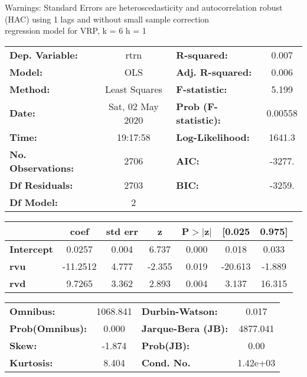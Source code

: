 Warnings: \newline
 [1] Standard Errors are heteroscedasticity and autocorrelation robust (HAC) using 1 lags and without small sample correction\\ 

regression model for VRP, k = 6 h = 1\begin{center}
\begin{tabular}{lclc}
\toprule
\textbf{Dep. Variable:}    &       rtrn       & \textbf{  R-squared:         } &     0.007   \\
\textbf{Model:}            &       OLS        & \textbf{  Adj. R-squared:    } &     0.006   \\
\textbf{Method:}           &  Least Squares   & \textbf{  F-statistic:       } &     5.199   \\
\textbf{Date:}             & Sat, 02 May 2020 & \textbf{  Prob (F-statistic):} &  0.00558    \\
\textbf{Time:}             &     19:17:58     & \textbf{  Log-Likelihood:    } &    1641.3   \\
\textbf{No. Observations:} &        2706      & \textbf{  AIC:               } &    -3277.   \\
\textbf{Df Residuals:}     &        2703      & \textbf{  BIC:               } &    -3259.   \\
\textbf{Df Model:}         &           2      & \textbf{                     } &             \\
\bottomrule
\end{tabular}
\begin{tabular}{lcccccc}
                   & \textbf{coef} & \textbf{std err} & \textbf{z} & \textbf{P$> |$z$|$} & \textbf{[0.025} & \textbf{0.975]}  \\
\midrule
\textbf{Intercept} &       0.0257  &        0.004     &     6.737  &         0.000        &        0.018    &        0.033     \\
\textbf{rvu}       &     -11.2512  &        4.777     &    -2.355  &         0.019        &      -20.613    &       -1.889     \\
\textbf{rvd}       &       9.7265  &        3.362     &     2.893  &         0.004        &        3.137    &       16.315     \\
\bottomrule
\end{tabular}
\begin{tabular}{lclc}
\textbf{Omnibus:}       & 1068.841 & \textbf{  Durbin-Watson:     } &    0.017  \\
\textbf{Prob(Omnibus):} &   0.000  & \textbf{  Jarque-Bera (JB):  } & 4877.041  \\
\textbf{Skew:}          &  -1.874  & \textbf{  Prob(JB):          } &     0.00  \\
\textbf{Kurtosis:}      &   8.404  & \textbf{  Cond. No.          } & 1.42e+03  \\
\bottomrule
\end{tabular}
\end{center}

